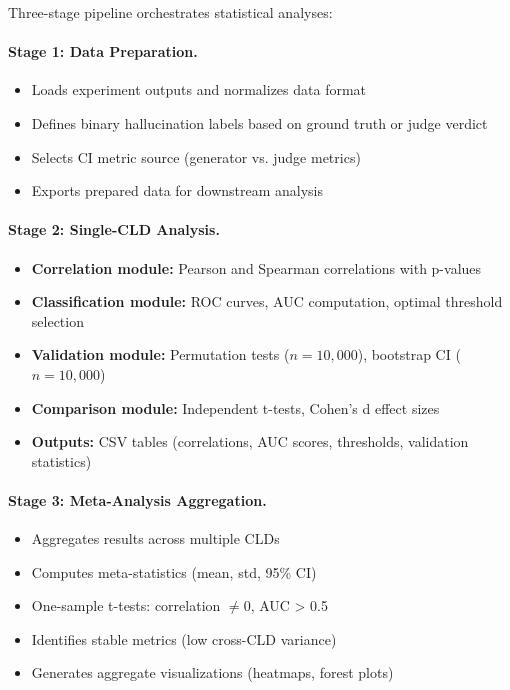 Three-stage pipeline orchestrates statistical analyses:

\paragraph{Stage 1: Data Preparation.}
\begin{itemize}
    \item Loads experiment outputs and normalizes data format
    \item Defines binary hallucination labels based on ground truth or judge verdict
    \item Selects CI metric source (generator vs. judge metrics)
    \item Exports prepared data for downstream analysis
\end{itemize}

\paragraph{Stage 2: Single-CLD Analysis.}
\begin{itemize}
    \item \textbf{Correlation module:} Pearson and Spearman correlations with p-values
    \item \textbf{Classification module:} ROC curves, AUC computation, optimal threshold selection
    \item \textbf{Validation module:} Permutation tests (\(n=10{,}000\)), bootstrap CI (\(n=10{,}000\))
    \item \textbf{Comparison module:} Independent t-tests, Cohen's d effect sizes
    \item \textbf{Outputs:} CSV tables (correlations, AUC scores, thresholds, validation statistics)
\end{itemize}

\paragraph{Stage 3: Meta-Analysis Aggregation.}
\begin{itemize}
    \item Aggregates results across multiple CLDs
    \item Computes meta-statistics (mean, std, 95\% CI)
    \item One-sample t-tests: correlation \(\neq 0\), AUC > 0.5
    \item Identifies stable metrics (low cross-CLD variance)
    \item Generates aggregate visualizations (heatmaps, forest plots)
\end{itemize}

